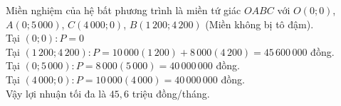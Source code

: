 \begin{ex}
{\begin{center}
		\end{center}
		Miền nghiệm của hệ bất phương trình là miền tứ giác $OABC$ với 
		$O(0; 0)$, $A(0; 5\,000)$, $C(4\,000; 0)$, $B(1\,200; 4\,200)$ (Miền không bị tô đậm).\\
		Tại $(0; 0): P = 0$\\
		Tại $(1\,200; 4\,200): P = 10\,000(1\,200) + 8\,000(4\,200)  = 45\,600\,000$ đồng.\\
		Tại $(0;5\,000): P = 8\,000(5\,000) = 40\,000\,000$ đồng.\\
		Tại $(4\,000; 0): P = 10\,000(4\,000) = 40\,000\,000$ đồng.\\
		Vậy lợi nhuận tối đa là $45{,}6$ triệu đồng/tháng.}
\end{ex}

